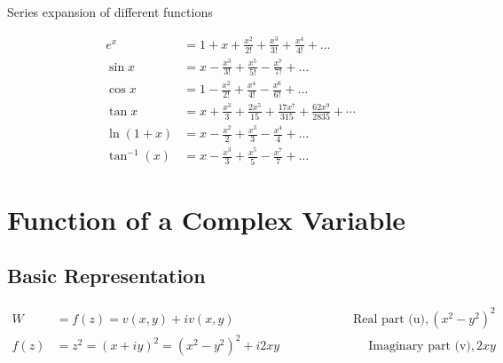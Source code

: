 \begin{note}
	Series expansion of different functions
	
	\begin{align*}
	e^{x}&=1+x+\frac{x^{2}}{2 !}+\frac{x^{3}}{3 !}+\frac{x^{4}}{4 !}+\ldots \\
	\sin x&=x-\frac{x^{3}}{3 !}+\frac{x^{5}}{5 !}-\frac{x^{7}}{7 !}+\ldots \\
	\cos x&=1-\frac{x^{2}}{2 !}+\frac{x^{4}}{4 !}-\frac{x^{6}}{6 !}+\ldots \\
	\tan x&=x+\frac{x^{3}}{3}+\frac{2 x^{5}}{15}+\frac{17 x^{7}}{315}+\frac{62 x^{9}}{2835} +\cdots\\
	\ln (1+x)&=x-\frac{x^{2}}{2}+\frac{x^{3}}{3}-\frac{x^{4}}{4}+\ldots \\
    \tan ^{-1}(x)&=x-\frac{x^{3}}{3}+\frac{x^{5}}{5}-\frac{x^{7}}{7}+\ldots
	\end{align*}
	\section{Function of a Complex Variable}
	\subsection{Basic Representation}
	\begin{align*}
	W&=f(z)=v(x, y)+i v(x, y)\hspace{4cm}\text{Real part (u)},\left(x^{2}-y^{2}\right)^{2}\\
	f(z)&=z^{2}=(x+i y)^{2}=\left(x^{2}-y^{2}\right)^{2}+i 2 x y\hspace{3cm}\text{Imaginary part (v)}, 2 x y
	\end{align*}

\end{note}

